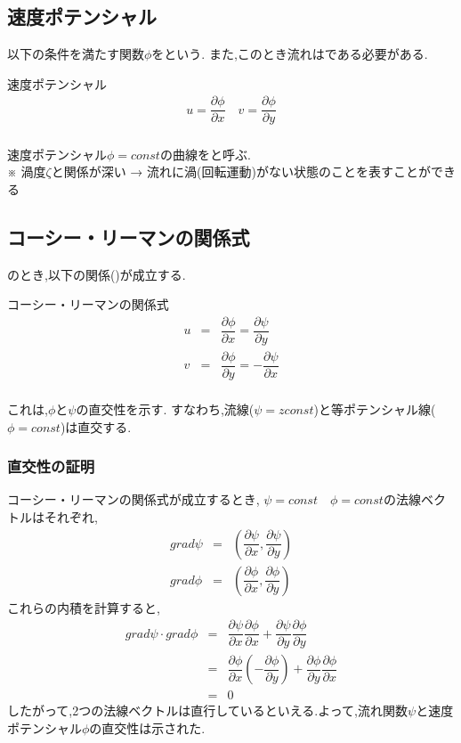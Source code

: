 \documentclass[a4paper]{jsarticle}
\begin{document}
\subsection{速度ポテンシャル}
以下の条件を満たす関数$\phi$をという.
また,このとき流れはである必要がある.
\begin{itembox}[l]{速度ポテンシャル}
    \begin{eqnarray*}
        u=\dfrac{\partial \phi}{\partial x}\quad v=\dfrac{\partial \phi}{\partial y}\\
    \end{eqnarray*}
\end{itembox}
速度ポテンシャル$\phi = const$の曲線をと呼ぶ.\\
※ 渦度$\zeta$と関係が深い → 流れに渦(回転運動)がない状態のことを表すことができる
\subsection{コーシー・リーマンの関係式}
のとき,以下の関係()が成立する.
\begin{itembox}[l]{コーシー・リーマンの関係式}
    \begin{eqnarray*}
        u&=&\dfrac{\partial \phi}{\partial x}=\dfrac{\partial \psi}{\partial y}\\
        v&=&\dfrac{\partial \phi}{\partial y}=-\dfrac{\partial \psi}{\partial x}\\
    \end{eqnarray*}
\end{itembox}
これは,$\phi$と$\psi$の直交性を示す.
すなわち,流線($\psi=zconst$)と等ポテンシャル線($\phi=const$)は直交する.
\subsubsection{直交性の証明}
コーシー・リーマンの関係式が成立するとき,
$\psi=const\quad \phi=const$の法線ベクトルはそれぞれ,
\begin{eqnarray*}
    grad \psi&=&\left(\dfrac{\partial \psi}{\partial x}, \dfrac{\partial \psi}{\partial y}\right)\\
    grad \phi&=&\left(\dfrac{\partial \phi}{\partial x}, \dfrac{\partial \phi}{\partial y}\right)
\end{eqnarray*}
これらの内積を計算すると,
\begin{eqnarray*}
    grad\psi \cdot grad\phi &=& \dfrac{\partial \psi}{\partial x}\dfrac{\partial \phi}{\partial x} +\dfrac{\partial \psi}{\partial y}\dfrac{\partial \phi}{\partial y}\\
    &=&\dfrac{\partial \phi}{\partial x}\left(-\dfrac{\partial \phi}{\partial y}\right)+\dfrac{\partial \phi}{\partial y}\dfrac{\partial \phi}{\partial x}\\
    &=&0
\end{eqnarray*}
したがって,2つの法線ベクトルは直行しているといえる.よって,流れ関数$\psi$と速度ポテンシャル$\phi$の直交性は示された.
\end{document}

